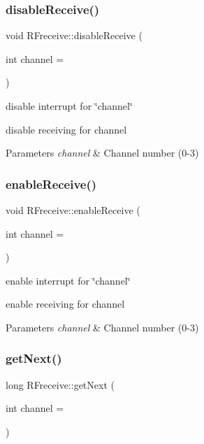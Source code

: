 \subsubsection{\texorpdfstring{disable\+Receive()}{disableReceive()}}
{\footnotesize\ttfamily void R\+Freceive\+::disable\+Receive (\begin{DoxyParamCaption}\item[{int}]{channel = {} }\end{DoxyParamCaption})}



disable interrupt for \char`\"{}channel\char`\"{} 

disable receiving for channel 
\begin{DoxyParams}{Parameters}
{\em channel} & Channel number (0-\/3) \\
\hline
\end{DoxyParams}
\mbox{\label{class_r_freceive_afb1e852bcae003d5d119debc4e73a2eb}} 
\subsubsection{\texorpdfstring{enable\+Receive()}{enableReceive()}}
{\footnotesize\ttfamily void R\+Freceive\+::enable\+Receive (\begin{DoxyParamCaption}\item[{int}]{channel = {} }\end{DoxyParamCaption})}



enable interrupt for \char`\"{}channel\char`\"{} 

enable receiving for channel 
\begin{DoxyParams}{Parameters}
{\em channel} & Channel number (0-\/3) \\
\hline
\end{DoxyParams}
\mbox{\label{class_r_freceive_a19e27dbf9e597c8df7fd0ba5ebcddcb4}} 
\subsubsection{\texorpdfstring{get\+Next()}{getNext()}}
{\footnotesize\ttfamily long R\+Freceive\+::get\+Next (\begin{DoxyParamCaption}\item[{int}]{channel = {} }\end{DoxyParamCaption})}



